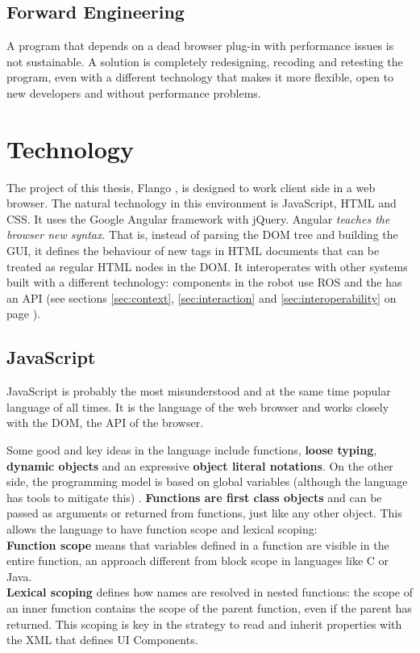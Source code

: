 \subsection{Forward Engineering} A program that depends on a dead browser plug-in with performance issues is not sustainable.
A solution is completely  redesigning, recoding and retesting the program, even with a different technology that makes it more flexible, open to new developers and without performance problems.


\section{Technology}
The project of this thesis, Flango \cm, is designed to work client side in a web browser.
The natural technology in this environment is JavaScript, \ac{HTML} and \ac{CSS}.
It uses the Google Angular framework with jQuery.
Angular \textit{teaches the browser new syntax}.
That is, instead of parsing the \ac{DOM} tree and building the \ac{GUI}, it defines the behaviour of new tags in \ac{HTML} documents that can be treated as regular \ac{HTML} nodes in the \ac{DOM}.
It interoperates with other systems built with a different technology: components in the robot use \ac{ROS} and the \flangobe has an \ac{API} (see sections \ref{sec:context}, \ref{sec:interaction} and \ref{sec:interoperability} on page \pageref{sec:context}).

\subsection{JavaScript}
JavaScript is probably the most misunderstood and at the same time popular language of all times.
It is the language of the web browser and works closely with the \ac{DOM}, the \ac{API} of the browser.

Some good and key ideas in the language include functions, \textbf{loose typing}, \textbf{dynamic objects} and an expressive \textbf{object literal notations}.
On the other side, the programming model is based on global variables (although the language has tools to mitigate this) \cite{Crockford}.
\textbf{Functions are first class objects} and can be passed as arguments or returned from functions, just like any other object.
This allows the language to have function scope and lexical scoping: \\
\textbf{Function scope} means that variables defined in a function are visible in the entire function, an approach different from block scope in languages like C or Java.\\
\textbf{Lexical scoping} defines how names are resolved in nested functions: the scope of an inner function contains the scope of the parent function, even if the parent has returned.
This scoping is key in the strategy to read and inherit properties with the \ac{XML} that defines UI Components.

